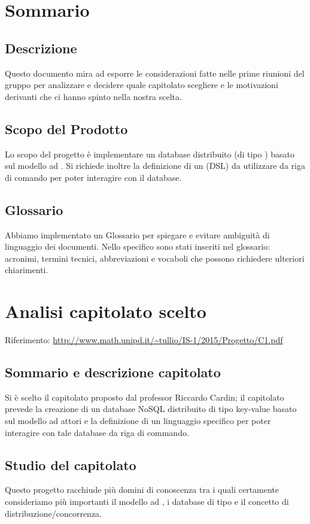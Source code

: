 \documentclass{scalatekids-article}
\begin{document}
\section{Sommario}
\subsection{Descrizione}
Questo documento mira ad esporre le considerazioni fatte nelle prime riunioni
del gruppo per analizzare e decidere quale capitolato scegliere e le motivazioni
derivanti che ci hanno spinto nella nostra scelta.

\subsection{Scopo del Prodotto}
Lo scopo del progetto è implementare un database  distribuito (di
tipo ) basato sul modello ad . Si richiede inoltre
la definizione di un  (DSL) da utilizzare da riga
di comando per poter interagire con il database.
\subsection{Glossario}
Abbiamo implementato un Glossario per spiegare e evitare ambiguità di
linguaggio dei documenti. Nello specifico sono stati inseriti nel glossario:
acronimi, termini tecnici, abbreviazioni e vocaboli che possono richiedere
ulteriori chiarimenti.

\section{Analisi capitolato scelto}

Riferimento: \url{http://www.math.unipd.it/~tullio/IS-1/2015/Progetto/C1.pdf}\\

\subsection{Sommario e descrizione capitolato}
Si è scelto il capitolato proposto dal professor Riccardo Cardin; il capitolato
prevede la creazione di un database NoSQL distribuito di tipo key-value basato
sul modello ad attori e la definizione di un linguaggio specifico per poter
interagire con tale database da riga di commando.

\subsection{Studio del capitolato}
Questo progetto racchiude più domini di conoscenza tra i quali certamente
consideriamo più importanti il modello ad , i database di tipo
 e il concetto di distribuzione/concorrenza.
\end{document}
